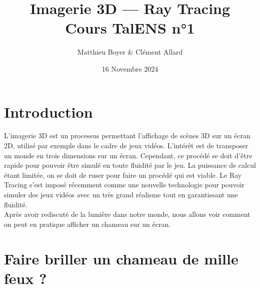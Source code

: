 \documentclass{classe}
\title{Imagerie 3D --- Ray Tracing\\ \small Cours TalENS n°1}
\author{Matthieu Boyer \& Clément Allard}
\date{16 Novembre 2024}
\begin{document}
\section*{Introduction}
L'imagerie 3D est un processus permettant l'affichage de scènes 3D sur un écran 2D, utilisé par exemple dans le cadre de jeux vidéos. L'intérêt est de transposer un monde en trois dimensions sur un écran. Cependant, ce procédé se doit d'être rapide pour pouvoir être simulé en toute fluidité par le jeu. La puissance de calcul étant limitée, on se doit de ruser pour faire un procédé qui est viable. Le Ray Tracing s'est imposé récemment comme une nouvelle technologie pour pouvoir simuler des jeux vidéos avec un très grand réalisme tout en garantissant une fluidité.
\\
Après avoir rediscuté de la lumière dans notre monde, nous allons voir comment on peut en pratique afficher un chameau sur un écran.

\section{Faire briller un chameau de mille feux ?}
\end{document}
